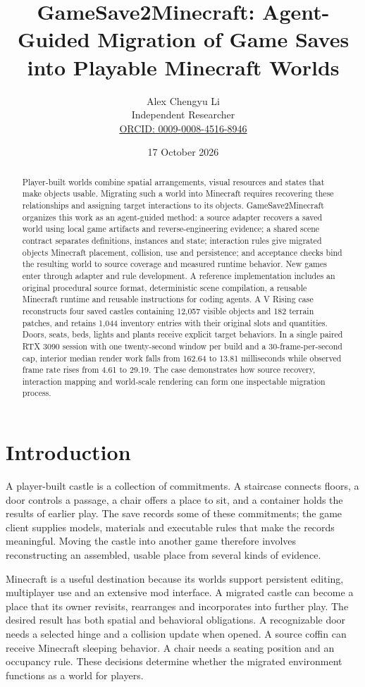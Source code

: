 \documentclass[11pt]{article}
\title{GameSave2Minecraft: Agent-Guided Migration of Game Saves into Playable Minecraft Worlds}
\author{Alex Chengyu Li\\\small Independent Researcher\\\small\href{https://orcid.org/0009-0008-4516-8946}{ORCID: 0009-0008-4516-8946}}
\date{17 October 2026}
\begin{document}
\maketitle
\begin{abstract}
Player-built worlds combine spatial arrangements, visual resources and states that
make objects usable. Migrating such a world into Minecraft requires recovering
these relationships and assigning target interactions to its objects.
GameSave2Minecraft organizes this work as an agent-guided method: a source adapter
recovers a saved world using local game artifacts and reverse-engineering
evidence; a shared scene contract separates definitions, instances and state;
interaction rules give migrated objects Minecraft placement, collision, use and
persistence; and acceptance checks bind the resulting world to source coverage
and measured runtime behavior. New games enter through adapter and rule
development. A reference implementation includes an original procedural source
format, deterministic scene compilation, a reusable Minecraft runtime and
reusable instructions for coding agents. A V Rising case reconstructs four
saved castles containing 12,057 visible objects and 182 terrain patches, and
retains 1,044 inventory entries with their original slots and quantities.
Doors, seats, beds, lights and plants receive explicit target behaviors. In a
single paired RTX 3090 session with one twenty-second window per build and a
30-frame-per-second cap, interior median render
work falls from 162.64 to 13.81 milliseconds while observed frame rate rises from
4.61 to 29.19. The case demonstrates how source recovery, interaction mapping and
world-scale rendering can form one inspectable migration process.
\end{abstract}

\section{Introduction}

A player-built castle is a collection of commitments. A staircase connects
floors, a door controls a passage, a chair offers a place to sit, and a container
holds the results of earlier play. The save records some of these commitments;
the game client supplies models, materials and executable rules that make the
records meaningful. Moving the castle into another game therefore involves
reconstructing an assembled, usable place from several kinds of evidence.

Minecraft is a useful destination because its worlds support persistent editing,
multiplayer use and an extensive mod interface. A migrated castle can become a
place that its owner revisits, rearranges and incorporates into further play.
The desired result has both spatial and behavioral obligations. A recognizable
door needs a selected hinge and a collision update when opened. A source coffin
can receive Minecraft sleeping behavior. A chair needs a seating position and
an occupancy rule. These decisions determine whether the migrated environment
functions as a world for players.
\end{document}

